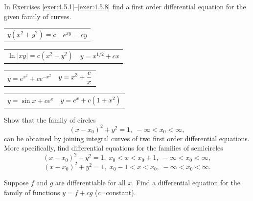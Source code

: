 \newpage

\exercises In Exercises \ref{exer:4.5.1}--\ref{exer:4.5.8} find a first order differential equation for the given family of curves.

\begin{exerciselist}
  \begin{tabular}[t]{@{}p{168pt}@{}p{168pt}}
    \item\label{exer:4.5.1} $y(x^{2}+y^{2})=c$ & \vspace*{10pt}
    \item\label{exer:4.5.2} $e^{xy}=cy$
  \end{tabular}

  \begin{tabular}[t]{@{}p{168pt}@{}p{168pt}}
    \item\label{exer:4.5.3} $\ln|xy|=c(x^{2}+y^{2})$ &
    \item\label{exer:4.5.4} $y=x^{1/2}+cx$
  \end{tabular}

  \begin{tabular}[t]{@{}p{168pt}@{}p{168pt}}
    \item\label{exer:4.5.5} $y=e^{x^{2}}+ce^{-x^{2}}$ &
    \item\label{exer:4.5.6} $\displaystyle{y=x^{3}+\frac{c}{x}}$
  \end{tabular}

  \begin{tabular}[t]{@{}p{168pt}@{}p{168pt}}
    \item\label{exer:4.5.7} $y=\sin x+ce^{x}$ &
    \item\label{exer:4.5.8} $y=e^{x}+c(1+x^{2})$
  \end{tabular}

  \item\label{exer:4.5.9} Show that the family of circles
  \[
    (x-x_{0})^{2}+y^{2}=1,\;-\infty<x_{0}<\infty,
  \]
  can be obtained by joining integral curves of two first order differential equations. More
  specifically, find differential equations for the families of semicircles
  \[
    (x-x_{0})^{2}+y^{2}=1,\;x_{0}<x<x_{0}+1,\;-\infty<x_{0}<\infty,
  \]
  \[
    (x-x_{0})^{2}+y^{2}=1,\;x_{0}-1<x<x_{0},\;-\infty<x_{0}<\infty.
  \]

  \item\label{exer:4.5.10} Suppose $f$ and $g$ are differentiable for all $x$. Find a differential
        equation for the family of functions $y=f+cg$ ($c$=constant).



\end{exerciselist}
